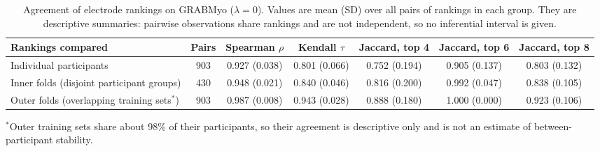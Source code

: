 \begin{table}[t]
\centering
\small
\caption{Agreement of electrode rankings on GRABMyo ($\lambda = 0$). Values are mean (SD) over all pairs of rankings in each group. They are descriptive summaries: pairwise observations share rankings and are not independent, so no inferential interval is given.}
\label{tab:stability}
\setlength{\tabcolsep}{4pt}
\begin{adjustbox}{max width=\textwidth}
\begin{tabular}{lcccccc}
\toprule
Rankings compared & Pairs & Spearman $\rho$ & Kendall $\tau$ & Jaccard, top 4 & Jaccard, top 6 & Jaccard, top 8 \\
\midrule
Individual participants & 903 & 0.927 (0.038) & 0.801 (0.066) & 0.752 (0.194) & 0.905 (0.137) & 0.803 (0.132) \\
Inner folds (disjoint participant groups) & 430 & 0.948 (0.021) & 0.840 (0.046) & 0.816 (0.200) & 0.992 (0.047) & 0.838 (0.105) \\
Outer folds (overlapping training sets$^*$) & 903 & 0.987 (0.008) & 0.943 (0.028) & 0.888 (0.180) & 1.000 (0.000) & 0.923 (0.106) \\
\bottomrule
\end{tabular}
\end{adjustbox}
\par\smallskip\parbox{0.95\linewidth}{\footnotesize $^*$Outer training sets share about 98\% of their participants, so their agreement is descriptive only and is not an estimate of between-participant stability.}
\end{table}
